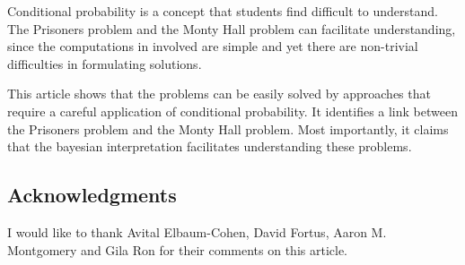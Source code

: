\documentclass[11pt,a4paper]{article}
\begin{document}
Conditional probability is a concept that students find difficult to understand. The Prisoners problem and the Monty Hall problem can facilitate understanding, since the computations in involved are simple and yet there are non-trivial difficulties in formulating solutions. 

This article shows that the problems can be easily solved by approaches that  require a careful application of conditional probability. It identifies a link between the Prisoners problem and the Monty Hall problem. Most importantly, it claims that the bayesian interpretation facilitates understanding these problems.


\subsection*{Acknowledgments}
I would like to thank Avital Elbaum-Cohen, David Fortus, Aaron M. Montgomery and Gila Ron for their comments on this article.

\end{document}
